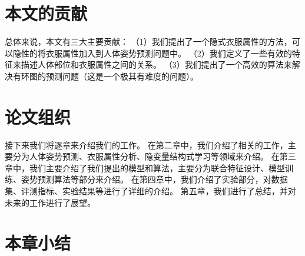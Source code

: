 \section{本文的贡献}
总体来说，本文有三大主要贡献：
（1）我们提出了一个隐式衣服属性的方法，可以隐性的将衣服属性加入到人体姿势预测问题中。
（2）我们定义了一些有效的特征来描述人体部位和衣服属性之间的关系。
（3）我们提出了一个高效的算法来解决有环图的预测问题（这是一个极其有难度的问题）。


\section{论文组织}
接下来我们将逐章来介绍我们的工作。
在第二章中，我们介绍了相关的工作，主要分为人体姿势预测、衣服属性分析、隐变量结构式学习等领域来介绍。
在第三章中，我们主要介绍了我们提出的模型和算法，主要分为联合特征设计、模型训练、姿势预测算法等部分来介绍。
在第四章中，我们介绍了实验部分，对数据集、评测指标、实验结果等进行了详细的介绍。
第五章，我们进行了总结，并对未来的工作进行了展望。

\section{本章小结}
